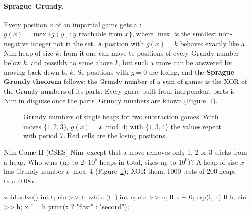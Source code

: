 \paragraph{Sprague--Grundy.} Every position $x$ of an impartial game gets a : $g(x) = \operatorname{mex}\{g(y) : y
\text{ reachable from } x\}$, where $\operatorname{mex}$ is the smallest non-negative integer not in the set. A position with $g(x) = k$
behaves exactly like a Nim heap of size $k$: from it one can move to positions of every Grundy number below $k$, and possibly to some
above $k$, but such a move can be answered by moving back down to $k$. So positions with $g = 0$ are losing, and the
\textbf{Sprague--Grundy theorem} follows: the Grundy number of a sum of games is the XOR of the Grundy numbers of its parts. Every game
built from independent parts is Nim in disguise once the parts' Grundy numbers are known (Figure~\ref{fig:grundy}).

\begin{figure}[htbp]
\centering
{}
\caption{Grundy numbers of single heaps for two subtraction games. With moves $\{1, 2, 3\}$, $g(x) = x \bmod 4$; with $\{1, 3, 4\}$ the
values repeat with period 7. Red cells are the losing positions.}
\label{fig:grundy}
\end{figure}


\begin{problem}{Nim Game II (CSES)}
Nim, except that a move removes only 1, 2 or 3 sticks from a heap. Who wins (up to $2 \cdot 10^5$ heaps in total, sizes up to
$10^9$)?
\solution A heap of size $x$ has Grundy number $x \bmod 4$ (Figure~\ref{fig:grundy}); XOR them. 1000 tests of 200 heaps take 0.08\,s.
\end{problem}

\begin{code}
void solve() {
    int t;
    cin >> t;
    while (t--) {
        int n;
        cin >> n;
        ll x = 0;
        rep(i, n) {
            ll h;
            cin >> h;
            x ^= h %
        }
        print(x ? "first" : "second");
    }
}
\end{code}

